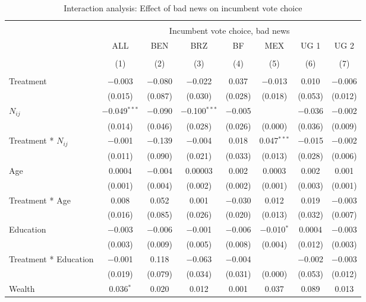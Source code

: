 \documentclass[]{article}
\begin{document}
\begin{table}[!htbp] \centering 
  \caption{Interaction analysis: Effect of bad news on incumbent vote choice} 
  \label{Interaction_bad} 
\begin{tabular}{@{\extracolsep{1pt}}lccccccc} 
\\[-1.8ex]\hline 
\hline \\[-1.8ex] 
 & \multicolumn{7}{c}{Incumbent vote choice, bad news} \\ 
\cline{2-8} 
 & ALL & BEN & BRZ & BF & MEX & UG 1 & UG 2 \\ 
\\[-1.8ex] & (1) & (2) & (3) & (4) & (5) & (6) & (7)\\ 
\hline \\[-1.8ex] 
 Treatment & $-$0.003 & $-$0.080 & $-$0.022 & 0.037 & $-$0.013 & 0.010 & $-$0.006 \\ 
  & (0.015) & (0.087) & (0.030) & (0.028) & (0.018) & (0.053) & (0.012) \\ 
  $N_{ij}$ & $-$0.049$^{***}$ & $-$0.090 & $-$0.100$^{***}$ & $-$0.005 &  & $-$0.036 & $-$0.002 \\ 
  & (0.014) & (0.046) & (0.028) & (0.026) & (0.000) & (0.036) & (0.009) \\ 
  Treatment * $N_{ij}$ & $-$0.001 & $-$0.139 & $-$0.004 & 0.018 & 0.047$^{***}$ & $-$0.015 & $-$0.002 \\ 
  & (0.011) & (0.090) & (0.021) & (0.033) & (0.013) & (0.028) & (0.006) \\ 
  Age & 0.0004 & $-$0.004 & 0.00003 & 0.002 & 0.0003 & 0.002 & 0.001 \\ 
  & (0.001) & (0.004) & (0.002) & (0.002) & (0.001) & (0.003) & (0.001) \\ 
  Treatment * Age & 0.008 & 0.052 & 0.001 & $-$0.030 & 0.012 & 0.019 & $-$0.003 \\ 
  & (0.016) & (0.085) & (0.026) & (0.020) & (0.013) & (0.032) & (0.007) \\ 
  Education & $-$0.003 & $-$0.006 & $-$0.001 & $-$0.006 & $-$0.010$^{*}$ & 0.0004 & $-$0.003 \\ 
  & (0.003) & (0.009) & (0.005) & (0.008) & (0.004) & (0.012) & (0.003) \\ 
  Treatment * Education & $-$0.001 & 0.118 & $-$0.063 & $-$0.004 &  & $-$0.002 & $-$0.003 \\ 
  & (0.019) & (0.079) & (0.034) & (0.031) & (0.000) & (0.053) & (0.012) \\ 
  Wealth & 0.036$^{*}$ & 0.020 & 0.012 & 0.001 & 0.037 & 0.089 & 0.013 \\ 

\end{tabular}
\end{table}
\end{document}

